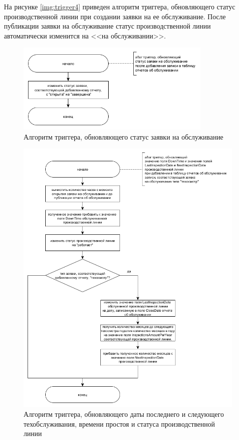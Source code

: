 На рисунке \ref{img:trigger4} приведен алгоритм триггера, обновляющего статус производственной линии при создании заявки на ее обслуживание. После публикации заявки на обслуживание статус производственной линии автоматически изменится на <<на обслуживании>>.


\begin{figure}[H]
    \centering
    \includegraphics[width=0.85\textwidth]{inc/img/trigger2.png}
    \caption{Алгоритм триггера, обновляющего статус заявки на обслуживание}
    \label{img:trigger2}
\end{figure}

\begin{figure}[H]
    \centering
    \includegraphics[width=1\textwidth]{inc/img/trigger3.png}
    \caption{Алгоритм триггера, обновляющего даты последнего и следующего техобслуживания, времени простоя и статуса производственной линии}
    \label{img:trigger3}
\end{figure}

